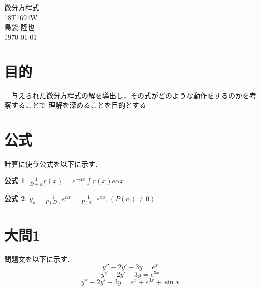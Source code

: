 \documentclass[a4paper,11pt]{bxjsarticle}
\newtheorem{mf}{公式}
\begin{document}
\begin{titlepage}
  \begin{center}
    \vspace*{150truept}
    {\Huge 微分方程式}\\ %
    \vspace{120truept}
    {\huge 18T1694W}\\ %
    \vspace{50truept}
    {\huge 島袋 隆也}\\ %
    \vspace{50truept}
    {\huge \today}\\ %
  \end{center}
\end{titlepage}


\section{目的}
　与えられた微分方程式の解を導出し，その式がどのような動作をするのかを考察することで
理解を深めることを目的とする

\section{公式}
計算に使う公式を以下に示す．
\begin{mf}
  $\frac{1}{D+\alpha}r(x) = e^{-\alpha x}\int r(x)e{\alpha x}$
  \label{mf:1}
\end{mf}
\begin{mf}
  $y_p=\frac{1}{P(D)}e^{\alpha x} = \frac{1}{P(\alpha)}e^{\alpha x}, (P(\alpha)\neq 0)$
  \label{mf:2}
\end{mf}

          

\section{大問1}
問題文を以下に示す．
\begin{equation}
  y''-2y'-3y=e^x
  \label{equ:1}
\end{equation}
\begin{equation}
  y''-2y'-3y=e^{3x}
  \label{equ:2}
\end{equation}
\begin{equation}
  y''-2y'-3y=e^x+e^{3x}+\sin x
  \label{equ:3}
\end{equation}
\end{document}
